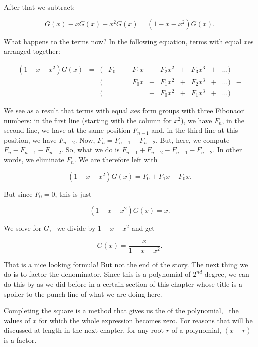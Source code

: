 \documentclass[tikz]{scrreprt}
\begin{document}
After that we subtract:

\begin{equation}
G(x) - xG(x) - x^2G(x) = (1-x-x^2)G(x).
\end{equation}

What happens to the terms now?
In the following equation, terms with equal $x$es
arranged together:

\begin{align*}
(1-x-x^2)G(x) & = & (&F_0 & + & F_1x & + & F_2x^2 & + & F_3x^3 & + & \dots) & - \\
              &   & (&    &   & F_0x & + & F_1x^2 & + & F_2x^3 & + & \dots) & - \\
              &   & (&    &   &      & + & F_0x^2 & + & F_1x^3 & + & \dots) &
\end{align*}

We see as a result that terms with equal $x$es form groups with 
three Fibonacci numbers: in the first line 
(starting with the column for $x^2$), we have $F_n$,
in the second line, we have at the same position $F_{n-1}$ and,
in the third line at this position, we have $F_{n-2}$.
Now, $F_n = F_{n-1} + F_{n-2}$.
But, here, we compute $F_n - F_{n-1} - F_{n-2}$.
So, what we do is $F_{n-1} + F_{n-2} - F_{n-1} - F_{n-2}$.
In other words, we eliminate $F_n$.
We are therefore left with

\begin{equation}
(1-x-x^2)G(x) = F_0 + F_1x - F_0x.
\end{equation}

But since $F_0 = 0$, this is just

\begin{equation}
(1-x-x^2)G(x) = x.
\end{equation}

We solve for $G$, \ie\ we divide by $1-x-x^2$ and get

\begin{equation}\label{eq:G1}
G(x) = \frac{x}{1-x-x^2}.
\end{equation}

That is a nice looking formula! But not the end of the story.
The next thing we do is to factor the denominator.
Since this is a polynomial of $2^{nd}$ degree,
we can do this by 
as we did before in a certain section of this chapter
whose title is a spoiler to the punch line of what
we are doing here.

Completing the square is a method that gives us the
 of the polynomial, \ie\ the values of $x$
for which the whole expression becomes zero.
For reasons that will be discussed at length in the next
chapter, for any root $r$ of a polynomial,
$(x-r)$ is a factor.
\end{document}
